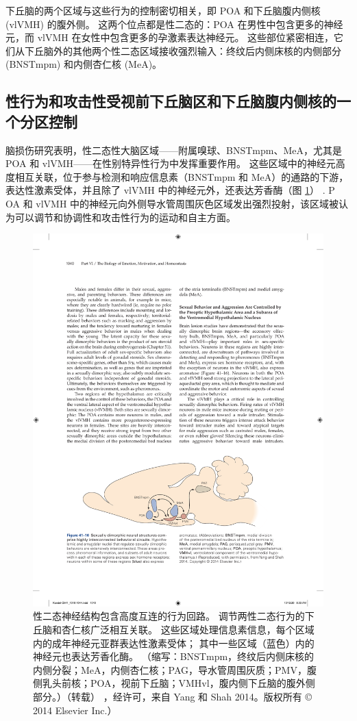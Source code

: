 下丘脑的两个区域与这些行为的控制密切相关，即 POA 和下丘脑腹内侧核 (vlVMH) 的腹外侧。 这两个位点都是性二态的：POA 在男性中包含更多的神经元，而 vlVMH 在女性中包含更多的孕激素表达神经元。 这些部位紧密相连，它们从下丘脑外的其他两个性二态区域接收强烈输入：终纹后内侧床核的内侧部分 (BNSTmpm) 和内侧杏仁核 (MeA)。

\subsection{性行为和攻击性受视前下丘脑区和下丘脑腹内侧核的一个分区控制}
脑损伤研究表明，性二态性大脑区域——附属嗅球、BNSTmpm、MeA，尤其是 POA 和 vlVMH——在性别特异性行为中发挥重要作用。 这些区域中的神经元高度相互关联，位于参与检测和响应信息素（BNSTmpm 和 MeA）的通路的下游，表达性激素受体，并且除了 vlVMH 中的神经元外，还表达芳香酶（图 \ref{fig:41_16}） . P
OA 和 vlVMH 中的神经元向外侧导水管周围灰色区域发出强烈投射，该区域被认为可以调节和协调性和攻击性行为的运动和自主方面。

\begin{figure}[htbp]
	\centering
	\includegraphics[width=0.8\linewidth]{chap41/fig_41_16}
	\caption{性二态神经结构包含高度互连的行为回路。 调节两性二态行为的下丘脑和杏仁核广泛相互关联。 这些区域处理信息素信息，每个区域内的成年神经元亚群表达性激素受体； 其中一些区域（蓝色）内的神经元也表达芳香化酶。 （缩写：BNSTmpm，终纹后内侧床核的内侧分裂；MeA，内侧杏仁核；PAG，导水管周围灰质；PMV，腹侧乳头前核；POA，视前下丘脑；VMHvl，腹内侧下丘脑的腹外侧部分。）（转载） ，经许可，来自 Yang 和 Shah 2014。版权所有 © 2014 Elsevier Inc.）}
	\label{fig:41_16}
\end{figure}

